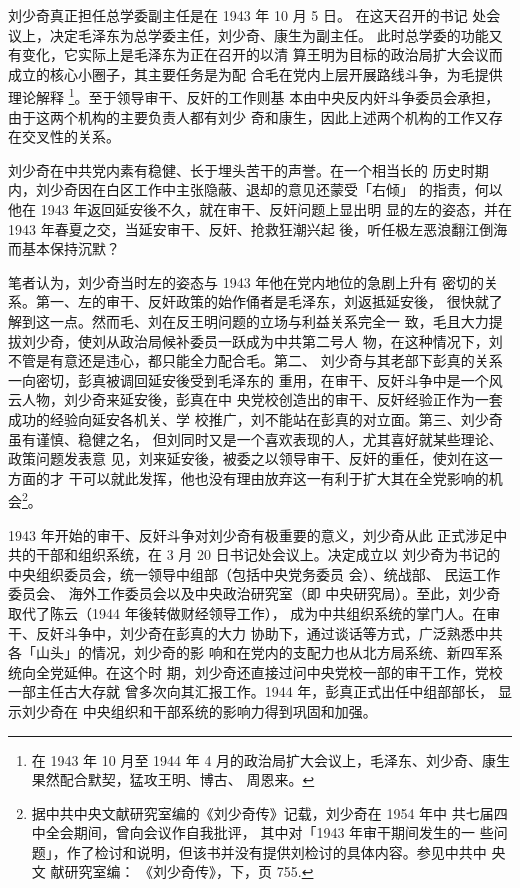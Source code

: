 刘少奇真正担任总学委副主任是在 1943 年 10 月 5 日。
在这天召开的书记
处会议上，决定毛泽东为总学委主任，刘少奇、康生为副主任。
此时总学委的功能又有变化，它实际上是毛泽东为正在召开的以清
算王明为目标的政治局扩大会议而成立的核心小圈子，其主要任务是为配
合毛在党内上层开展路线斗争，为毛提供理论解释
\footnote{在 1943 年 10 月至 1944 年 4 月的政治局扩大会议上，毛泽东、刘少奇、康生果然配合默契，猛攻王明、博古、
周恩来。}。至于领导审干、反奸的工作则基
本由中央反内奸斗争委员会承担，由于这两个机构的主要负责人都有刘少
奇和康生，因此上述两个机构的工作又存在交叉性的关系。

刘少奇在中共党内素有稳健、长于埋头苦干的声誉。在一个相当长的
历史时期内，刘少奇因在白区工作中主张隐蔽、退却的意见还蒙受「右倾」
的指责，何以他在 1943 年返回延安後不久，就在审干、反奸问题上显出明
显的左的姿态，并在 1943 年春夏之交，当延安审干、反奸、抢救狂潮兴起
後，听任极左恶浪翻江倒海而基本保持沉默？

笔者认为，刘少奇当时左的姿态与 1943 年他在党内地位的急剧上升有 密切的关
系。第一、左的审干、反奸政策的始作俑者是毛泽东，刘返抵延安後， 很快就了
解到这一点。然而毛、刘在反王明问题的立场与利益关系完全一 致，毛且大力提
拔刘少奇，使刘从政治局候补委员一跃成为中共第二号人 物，在这种情况下，刘
不管是有意还是违心，都只能全力配合毛。第二、 刘少奇与其老部下彭真的关系
一向密切，彭真被调回延安後受到毛泽东的 重用，在审干、反奸斗争中是一个风
云人物，刘少奇来延安後，彭真在中 央党校创造出的审干、反奸经验正作为一套
成功的经验向延安各机关、学 校推广，刘不能站在彭真的对立面。第三、刘少奇
虽有谨慎、稳健之名， 但刘同时又是一个喜欢表现的人，尤其喜好就某些理论、
政策问题发表意 见，刘来延安後，被委之以领导审干、反奸的重任，使刘在这一
方面的才 干可以就此发挥，他也没有理由放弃这一有利于扩大其在全党影响的机
会\footnote{据中共中央文献研究室编的《刘少奇传》记载，刘少奇在 1954 年中
共七届四中全会期间，曾向会议作自我批评， 其中对「1943 年审干期间发生的一
些问题」，作了检讨和说明，但该书并没有提供刘检讨的具体内容。参见中共中
央文 献研究室编： 《刘少奇传》，下，页 755.  }。

1943 年开始的审干、反奸斗争对刘少奇有极重要的意义，刘少奇从此 正式涉足中
共的干部和组织系统，在 3 月 20 日书记处会议上。决定成立以 刘少奇为书记的
中央组织委员会，统一领导中组部（包括中央党务委员 会）、统战部、 民运工作
委员会、 海外工作委员会以及中央政治研究室（即 中央研究局）。至此，刘少奇
取代了陈云（1944 年後转做财经领导工作）， 成为中共组织系统的掌门人。在审
干、反奸斗争中，刘少奇在彭真的大力 协助下，通过谈话等方式，广泛熟悉中共
各「山头」的情况，刘少奇的影 响和在党内的支配力也从北方局系统、新四军系
统向全党延伸。在这个时 期，刘少奇还直接过问中央党校一部的审干工作，党校
一部主任古大存就 曾多次向其汇报工作。1944 年，彭真正式出任中组部部长，
显示刘少奇在 中央组织和干部系统的影响力得到巩固和加强。

